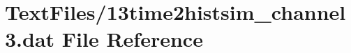 \hypertarget{13time2histsim__channel3_8dat}{}\section{Text\+Files/13time2histsim\+\_\+channel3.dat File Reference}
\label{13time2histsim__channel3_8dat}
